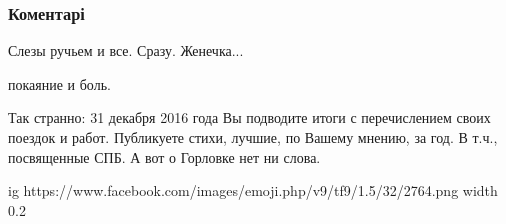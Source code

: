  
 
 
 
 
\subsubsection{Коментарі}
\label{sec:27_07_2021.fb.bilchenko_evgenia.8.moje_kreschenie_gorlovka.cmt}

\begin{itemize}
 
Слезы ручьем и все. Сразу. Женечка...

 
покаяние и боль.

 

Так странно: 31 декабря 2016 года Вы подводите итоги с перечислением своих
поездок и работ. Публикуете стихи, лучшие, по Вашему мнению, за год. В т.ч.,
посвященные СПБ. А вот о Горловке нет ни слова.

 

\ifcmt
  ig https://www.facebook.com/images/emoji.php/v9/tf9/1.5/32/2764.png
  width 0.2
\fi
\end{itemize}

